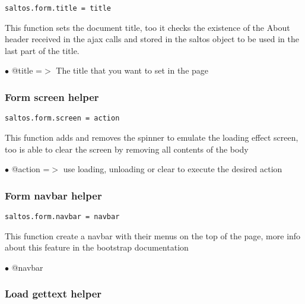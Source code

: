 \documentclass[a4paper]{article}
\begin{document}
\begin{lstlisting}
saltos.form.title = title
\end{lstlisting}

This function sets the document title, too it checks the existence of the About
header received in the ajax calls and stored in the saltos object to be used in the
last part of the title.

\begin{compactitem}
\item[\color{myblue}$\bullet$] @title =$>$ The title that you want to set in the page
\end{compactitem}

\hypertarget{toc789}{}
\subsubsection{Form screen helper}

\begin{lstlisting}
saltos.form.screen = action
\end{lstlisting}

This function adds and removes the spinner to emulate the loading effect screen, too is able
to clear the screen by removing all contents of the body

\begin{compactitem}
\item[\color{myblue}$\bullet$] @action =$>$ use loading, unloading or clear to execute the desired action
\end{compactitem}

\hypertarget{toc790}{}
\subsubsection{Form navbar helper}

\begin{lstlisting}
saltos.form.navbar = navbar
\end{lstlisting}

This function create a navbar with their menus on the top of the page, more
info about this feature in the bootstrap documentation

\begin{compactitem}
\item[\color{myblue}$\bullet$] @navbar
\end{compactitem}

\hypertarget{toc791}{}
\subsubsection{Load gettext helper}
\end{document}
